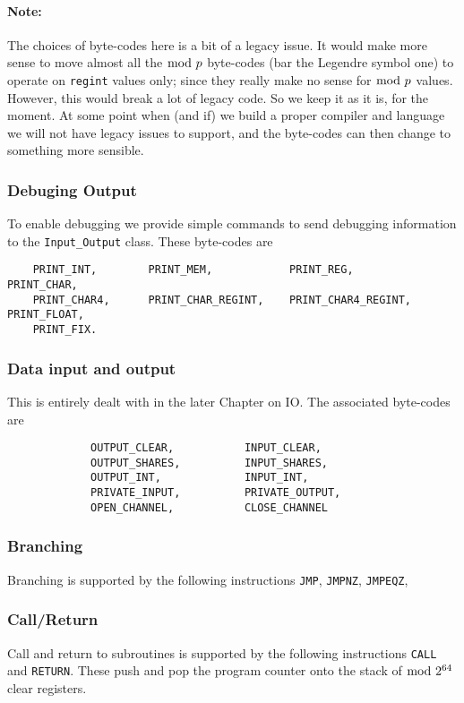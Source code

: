 \paragraph{Note:}
The choices of byte-codes here is a bit of a legacy issue. It would
make more sense to move almost all the $\bmod \; p$ byte-codes (bar the Legendre symbol
one) to operate on \verb|regint| values only; since they really make
no sense for $\bmod \; p$ values. However, this would break a lot of legacy code.
So we keep it as it is, for the moment. At some point when (and if) we build a proper
compiler and language we will not have legacy issues to support, and the
byte-codes can then change to something more sensible.

\subsubsection{Debuging Output}
To enable debugging we provide simple commands to send
debugging information to the \verb+Input_Output+ class.
These byte-codes are
\begin{verbatim}
    PRINT_INT,        PRINT_MEM,            PRINT_REG,              PRINT_CHAR,
    PRINT_CHAR4,      PRINT_CHAR_REGINT,    PRINT_CHAR4_REGINT,     PRINT_FLOAT,
    PRINT_FIX.
\end{verbatim}

\subsubsection{Data input and output}
This is entirely dealt with in the later Chapter on IO.
The associated byte-codes are
\begin{verbatim}
             OUTPUT_CLEAR,           INPUT_CLEAR,
             OUTPUT_SHARES,          INPUT_SHARES,
             OUTPUT_INT,             INPUT_INT,
             PRIVATE_INPUT,          PRIVATE_OUTPUT,
             OPEN_CHANNEL,           CLOSE_CHANNEL
\end{verbatim}

\subsubsection{Branching}
Branching is supported by the following instructions
 \verb+JMP+,
    \verb+JMPNZ+,
    \verb+JMPEQZ+,

\subsubsection{Call/Return}
Call and return to subroutines is supported by the following
instructions
\verb+CALL+ and \verb+RETURN+.
These push and pop the program counter onto the stack of
$\bmod \; 2^{64}$ clear registers.


